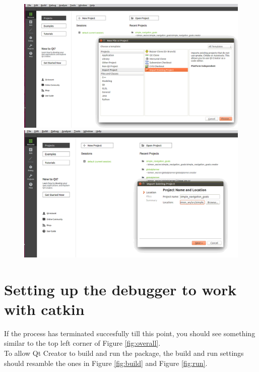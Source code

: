 \documentclass[11pt,a4paper]{article}
\begin{document}
\begin{figure}[!htb]
    \centering
    \begin{minipage}{.5\textwidth}
        \centering
        \includegraphics[width=0.9\linewidth, height=0.2\textheight]{figures/import_1}
        \caption{}
        \label{fig:imp_1}
    \end{minipage}%
    \begin{minipage}{.5\textwidth}
        \centering
        \includegraphics[width=0.9\linewidth, height=0.2\textheight]{figures/import_2}
        \caption{}
        \label{fig:imp_2}
    \end{minipage}
 \end{figure}


\section{Setting up the debugger to work with catkin} \label{sec:debug}

If the process has terminated succesfully till this point, you should see something similar to the top left corner of Figure \ref{fig:overall}. \\
To allow Qt Creator to build and run the package, the build and run settings should resamble the ones in Figure \ref{fig:build} and Figure \ref{fig:run}.
\end{document}
